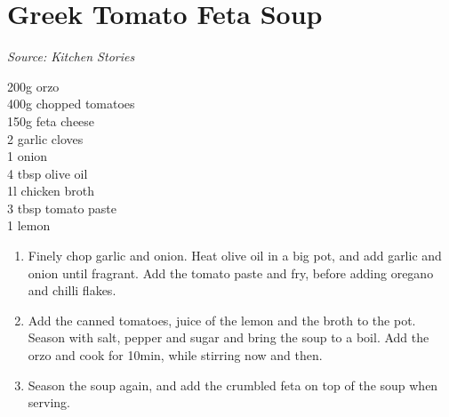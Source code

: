 \documentclass{report}
\begin{document}
\section{Greek Tomato Feta Soup}
\textit{Source: Kitchen Stories}\\
\begin{minipage}[t]{0.21\textwidth} \vspace{0pt}
200g orzo\\
400g chopped tomatoes\\
150g feta cheese\\
2 garlic cloves\\
1 onion\\
4 tbsp olive oil\\
1l chicken broth\\
3 tbsp tomato paste\\
1 lemon
\end{minipage}
\hfill
\begin{minipage}[t]{0.78\textwidth} \vspace{0pt}
	\begin{enumerate}
		\item Finely chop garlic and onion. Heat olive oil in a big pot, and add garlic and onion until fragrant. Add the tomato paste and fry, before adding oregano and chilli flakes.
		\item Add the canned tomatoes, juice of the lemon and the broth to the pot. Season with salt, pepper and sugar and bring the soup to a boil. Add the orzo and cook for 10min, while stirring now and then.
		\item Season the soup again, and add the crumbled feta on top of the soup when serving.
	\end{enumerate}	
\end{minipage}
\end{document}
